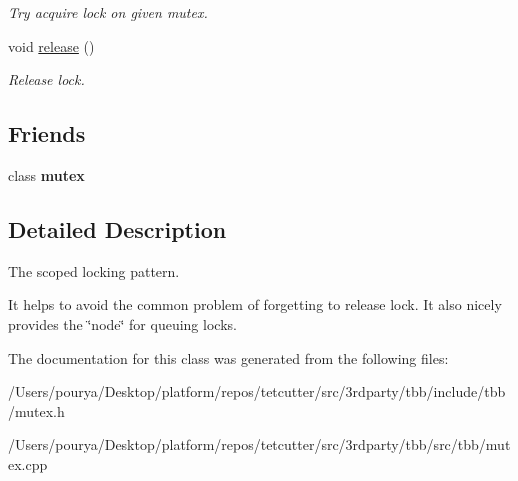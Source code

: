 \begin{DoxyCompactItemize}
\begin{DoxyCompactList}\small\item\em Try acquire lock on given mutex. \end{DoxyCompactList}\item 
\hypertarget{classtbb_1_1mutex_1_1scoped__lock_a1a1590281ccca912229a689d920fd78a}{}void \hyperlink{classtbb_1_1mutex_1_1scoped__lock_a1a1590281ccca912229a689d920fd78a}{release} ()\label{classtbb_1_1mutex_1_1scoped__lock_a1a1590281ccca912229a689d920fd78a}

\begin{DoxyCompactList}\small\item\em Release lock. \end{DoxyCompactList}\end{DoxyCompactItemize}
\subsection*{Friends}
\begin{DoxyCompactItemize}
\item 
\hypertarget{classtbb_1_1mutex_1_1scoped__lock_a6f4535025b9df015e1a7d35f4e2bbee7}{}class {\bfseries mutex}\label{classtbb_1_1mutex_1_1scoped__lock_a6f4535025b9df015e1a7d35f4e2bbee7}

\end{DoxyCompactItemize}


\subsection{Detailed Description}
The scoped locking pattern. 

It helps to avoid the common problem of forgetting to release lock. It also nicely provides the \char`\"{}node\char`\"{} for queuing locks. 

The documentation for this class was generated from the following files\+:\begin{DoxyCompactItemize}
\item 
/\+Users/pourya/\+Desktop/platform/repos/tetcutter/src/3rdparty/tbb/include/tbb/mutex.\+h\item 
/\+Users/pourya/\+Desktop/platform/repos/tetcutter/src/3rdparty/tbb/src/tbb/mutex.\+cpp\end{DoxyCompactItemize}
